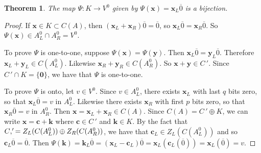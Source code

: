 \documentclass[12pt,twoside,singlespace]{article}
\numberwithin{equation}{section}
\newtheorem{thm}[equation]{Theorem}
\theoremstyle{definition}
\renewcommand{\vec}[1]{\mathbf{#1}}
\begin{document}
\begin{thm}
\label{thm:kv0}
The map $\Psi:K\to V^0$
given by $\Psi(\vec{x})=\vec{x}_L\overline{0}$ is a bijection.
\end{thm}
\begin{proof}
If $\vec{x}\in K\subset C(A)$, then $(\vec{x}_L+\vec{x}_R)\overline{0}=\overline{0}$, so $\vec{x}_L\overline{0}=\vec{x}_R\overline{0}$.  So $\Psi(\vec{x})\in A_L^0\cap A_R^0=V^0$.

To prove $\Psi$ is one-to-one, suppose $\Psi(\vec{x})=\Psi(\vec{y})$.  Then $\vec{x}_L\overline{0}=\vec{y}_L\overline{0}$.  Therefore $\vec{x}_L+\vec{y}_L\in C(A_L^0)$.  Likewise $\vec{x}_R+\vec{y}_R\in C(A_R^0)$.  So $\vec{x}+\vec{y}\in C\,'$.  Since $C\,'\cap K=\{\vec{0}\}$, we have that $\Psi$ is one-to-one.

To prove $\Psi$ is onto, let $v\in V^0$.  Since $v\in A_L^0$, there exists $\vec{x}_L$ with last $q$ bits zero, so that $\vec{x}_L\overline{0}=v$ in $A_L^0$.  Likewise there exists $\vec{x}_R$ with first $p$ bits zero, so that $\vec{x}_R\overline{0}=v$ in $A_R^0$.  Then $\vec{x}=\vec{x}_L+\vec{x}_R\in C(A)$.  Since $C(A)=C\,'\oplus K$, we can write $\vec{x}=\vec{c}+\vec{k}$ where $\vec{c}\in C\,'$ and $\vec{k}\in K$.  By the fact that $C\\,'=Z_L(C(A_L^0))\oplus Z_R(C(A_R^0))$, we have that $\vec{c}_L\in Z_L(C(A_L^0))$ and so $\vec{c}_L\overline{0}=\overline{0}$.  Then
$\Psi(\vec{k})=\vec{k}_L\overline{0}
=(\vec{x}_L-\vec{c}_L)\overline{0}
=\vec{x}_L(\vec{c}_L(\overline{0}))
=\vec{x}_L(\overline{0})
=v.$
\end{proof}
\end{document}
